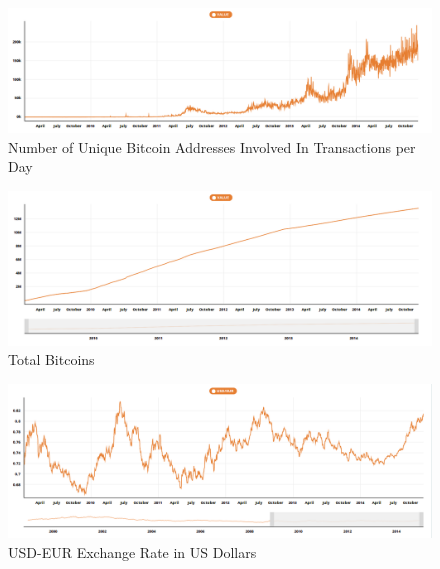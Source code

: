 \documentclass{article}[10 pt]
\newcommand{\vs}{\vspace{0.1in}}
\begin{document}
\vs

\begin{figure}[ht!]

\centering

\includegraphics[width=150mm]{address_day.png}

\caption{Number of Unique Bitcoin Addresses Involved In Transactions per Day}

\label{overflow}

\end{figure}

\vs

\begin{figure}[ht!]

\centering

\includegraphics[width=150mm]{tot_btc.png}

\caption{Total Bitcoins}

\label{overflow}

\end{figure}

\vs

\begin{figure}[ht!]

\centering

\includegraphics[width=150mm]{USD_EUR.png}

\caption{USD-EUR Exchange Rate in US Dollars}

\label{overflow}

\end{figure}
\end{document}
